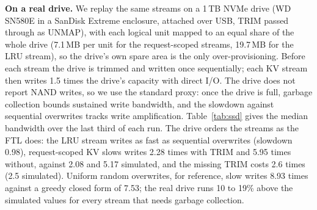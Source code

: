 \documentclass[acmsmall,screen,review]{acmart}
\begin{document}
\textbf{On a real drive.} We replay the same streams on a 1\,TB NVMe drive (WD SN580E in a SanDisk
Extreme enclosure, attached over USB, TRIM passed through as UNMAP), with each logical unit
mapped to an equal share of the whole drive (7.1\,MB per unit for the request-scoped streams, 19.7\,MB
for the LRU stream), so the drive's own spare area is the only over-provisioning. Before each stream the
drive is trimmed and written once sequentially; each KV stream then writes 1.5 times the drive's
capacity with direct I/O. The drive does not report NAND writes, so we use the standard proxy: once the drive
is full, garbage collection bounds sustained write bandwidth, and the slowdown against sequential
overwrites tracks write amplification. Table~\ref{tab:ssd} gives the median bandwidth over the last
third of each run. The drive orders the streams as the FTL does: the LRU stream writes as fast as
sequential overwrites (slowdown 0.98), request-scoped KV slows writes 2.28 times with TRIM and 5.95
times without, against 2.08 and 5.17 simulated, and the missing TRIM costs 2.6 times (2.5 simulated).
Uniform random overwrites, for reference, slow writes 8.93 times against a greedy closed form of 7.53;
the real drive runs 10 to 19\% above the simulated values for every stream that needs garbage
collection.

\begin{table}[t]
\caption{Real drive (1\,TB WD SN580E over USB): steady host write bandwidth with the drive full,
slowdown against sequential overwrites, and the write amplification of our FTL for the same stream
at 7\% over-provisioning.}
\label{tab:ssd}
\small

\end{table}
\end{document}

